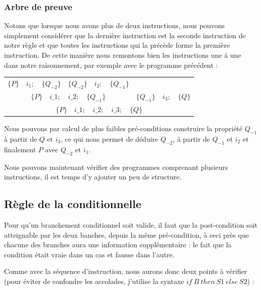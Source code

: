 \documentclass[12pt,francais,]{scrbook}
\begin{document}
\subsubsection{Arbre de preuve}\label{arbre-de-preuve}

Notons que lorsque nous avons plus de deux instructions, nous pouvons
simplement considérer que la dernière instruction est la seconde
instruction de notre règle et que toutes les instructions qui la précède
forme la première \og{}instruction\fg{}. De cette manière nous remontons bien
les instructions une à une dans notre raisonnement, par exemple avec le
programme précédent :

\begin{center}
\begin{tabular}{ccc}
  $\{P\}\quad i_1 ; \quad \{Q_{-2}\}$ & $\{Q_{-2}\}\quad i_2 ; \quad \{Q_{-1}\}$ & \\
  \cline{1-2}
  \multicolumn{2}{c}{$\{P\}\quad i\_1 ; \quad i\_2 ; \quad \{Q_{-1}\}$} & $\{Q_{-1}\} \quad i_3 ; \quad \{Q\}$\\
  \hline
  \multicolumn{3}{c}{$\{P\}\quad i\_1 ; \quad i\_2 ; \quad i\_3; \quad \{ Q \}$}
\end{tabular}
\end{center}

Nous pouvons par calcul de plus faibles pré-conditions construire la
propriété \(Q_{-1}\) à partir de \(Q\) et \(i_3\), ce qui nous permet de
déduire \(Q_{-2}\), à partir de \(Q_{-1}\) et \(i_2\) et finalement
\(P\) avec \(Q_{-2}\) et \(i_1\).

Nous pouvons maintenant vérifier des programmes comprenant plusieurs
instructions, il est temps d'y ajouter un peu de structure.

\subsection{Règle de la
conditionnelle}\label{ruxe8gle-de-la-conditionnelle}

Pour qu'un branchement conditionnel soit valide, il faut que la
post-condition soit atteignable par les deux banches, depuis la même
pré-condition, à ceci près que chacune des branches aura une information
supplémentaire : le fait que la condition était vraie dans un cas et
fausse dans l'autre.

Comme avec la séquence d'instruction, nous aurons donc deux points à
vérifier (pour éviter de confondre les accolades, j'utilise la syntaxe
\(if\ B\ then\ S1\ else\ S2\)) :
\end{document}
